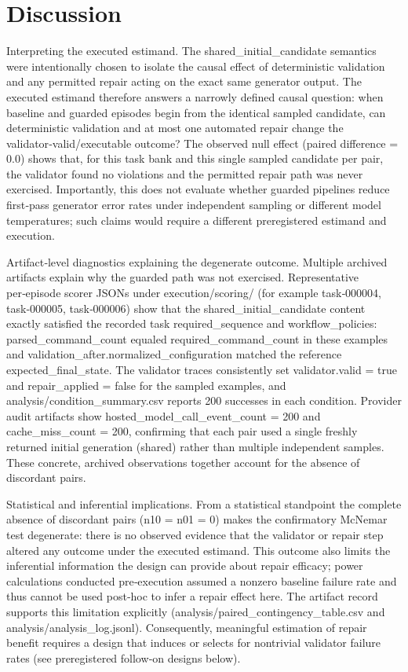\documentclass[conference]{IEEEtran}
\begin{document}
\section{Discussion}
Interpreting the executed estimand. The shared\_initial\_candidate semantics were intentionally chosen to isolate the causal effect of deterministic validation and any permitted repair acting on the exact same generator output. The executed estimand therefore answers a narrowly defined causal question: when baseline and guarded episodes begin from the identical sampled candidate, can deterministic validation and at most one automated repair change the validator‑valid/executable outcome? The observed null effect (paired difference = 0.0) shows that, for this task bank and this single sampled candidate per pair, the validator found no violations and the permitted repair path was never exercised. Importantly, this does not evaluate whether guarded pipelines reduce first‑pass generator error rates under independent sampling or different model temperatures; such claims would require a different preregistered estimand and execution.

Artifact‑level diagnostics explaining the degenerate outcome. Multiple archived artifacts explain why the guarded path was not exercised. Representative per‑episode scorer JSONs under execution/scoring/ (for example task‑000004, task‑000005, task‑000006) show that the shared\_initial\_candidate content exactly satisfied the recorded task required\_sequence and workflow\_policies: parsed\_command\_count equaled required\_command\_count in these examples and validation\_after.normalized\_configuration matched the reference expected\_final\_state. The validator traces consistently set validator.valid = true and repair\_applied = false for the sampled examples, and analysis/condition\_summary.csv reports 200 successes in each condition. Provider audit artifacts show hosted\_model\_call\_event\_count = 200 and cache\_miss\_count = 200, confirming that each pair used a single freshly returned initial generation (shared) rather than multiple independent samples. These concrete, archived observations together account for the absence of discordant pairs.

Statistical and inferential implications. From a statistical standpoint the complete absence of discordant pairs (n10 = n01 = 0) makes the confirmatory McNemar test degenerate: there is no observed evidence that the validator or repair step altered any outcome under the executed estimand. This outcome also limits the inferential information the design can provide about repair efficacy; power calculations conducted pre‑execution assumed a nonzero baseline failure rate and thus cannot be used post‑hoc to infer a repair effect here. The artifact record supports this limitation explicitly (analysis/paired\_contingency\_table.csv and analysis/analysis\_log.jsonl). Consequently, meaningful estimation of repair benefit requires a design that induces or selects for nontrivial validator failure rates (see preregistered follow‑on designs below).
\end{document}
